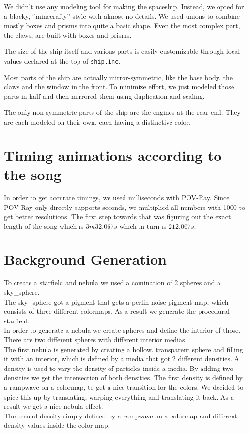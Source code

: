 \documentclass[a4paper, 12pt]{scrartcl}
\begin{document}
    We didn't use any modeling tool for making the spaceship. Instead, we opted for a blocky, ``minecrafty'' style with almost no details. We used unions to combine mostly boxes and prisms into quite a basic shape. Even the most complex part, the claws, are built with boxes and prisms.

    The size of the ship itself and various parts is easily customizable through local values declared at the top of \texttt{ship.inc}.

    Most parts of the ship are actually mirror-symmetric, like the base body, the claws and the window in the front. To minimize effort, we just modeled those parts in half and then mirrored them using duplication and scaling.

    The only non-symmetric parts of the ship are the engines at the rear end. They are each modeled on their own, each having a distinctive color.

    \section{Timing animations according to the song}

    In order to get accurate timings, we used milliseconds with POV-Ray. Since POV-Ray only
    directly supports seconds, we multiplied all numbers with 1000 to get better resolutions.
    The first step towards that was figuring out the exact length of the song which is
    \(3m32.067s\)
    which in turn is \(212.067s\).

    \section{Background Generation}

    To create a starfield and nebula we used a comination of 2 spheres and a sky\_sphere. \\ 
    The sky\_sphere got a pigment that gets a perlin noise pigment map, which consists of three different colormaps. As a result we generate the procedural starfield. \\
    In order to generate a nebula we create spheres and define the interior of those. There are two different spheres with different interior medias. \\
    The first nebula is generated by creating a hollow, transparent sphere and filling it with an interior, which is defined by a media that got 2 different densities. A density is used to vary the density of particles inside a media.
    By adding two densities we get the intersection of both densities. The first density is defined by a rampwave on a colormap, to get a nice transition for the colors. We decided to spice this up by translating, warping everything and translating it back. As a result we get a nice nebula effect. \\
    The second density simply defined by a rampwave on a colormap and different density values inside the color map.
\end{document}
